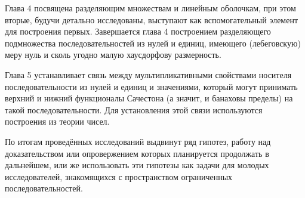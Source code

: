 Глава 4 посвящена разделяющим множествам и линейным оболочкам, при этом вторые,
будучи детально исследованы, выступают как вспомогательный элемент для построения первых.
Завершается глава 4 построением разделяющего подмножества последовательностей из нулей и единиц,
имеющего (лебеговскую) меру нуль и сколь угодно малую хаусдорфову размерность.

Глава 5 устанавливает связь между мультипликативными свойствами носителя последовательности
из нулей и единиц и значениями, который могут принимать верхний и нижний функционалы Сачестона
(а значит, и банаховы пределы) на такой последовательности.
Для установления этой связи используются построения из теории чисел.


По итогам проведённых исследований выдвинут ряд гипотез,
работу над доказательством или опровержением которых планируется продолжать в дальнейшем,
или же использовать эти гипотезы как задачи для молодых исследователей,
знакомящихся с пространством ограниченных последовательностей.
